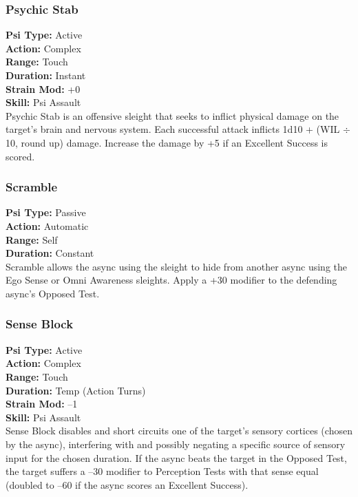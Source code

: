 \subsubsection{Psychic Stab}
\textbf{Psi Type:} Active \\ 
\textbf{Action:} Complex \\ 
\textbf{Range:} Touch \\ 
\textbf{Duration:} Instant \\
\textbf{Strain Mod:} +0 \\ 
\textbf{Skill:} Psi Assault \\
Psychic Stab is an offensive sleight that seeks to inflict
physical damage on the target’s brain and nervous
system. Each successful attack inflicts 1d10 + (WIL $\div$
10, round up) damage. Increase the damage by +5 if
an Excellent Success is scored.

\subsubsection{Scramble}
\textbf{Psi Type:} Passive \\ 
\textbf{Action:} Automatic \\ 
\textbf{Range:} Self \\ 
\textbf{Duration:} Constant \\
Scramble allows the async using the sleight to hide
from another async using the Ego Sense or Omni
Awareness sleights. Apply a +30 modifier to the defending
async’s Opposed Test.

\subsubsection{Sense Block}
\textbf{Psi Type:} Active \\ 
\textbf{Action:} Complex \\ 
\textbf{Range:} Touch \\ 
\textbf{Duration:} Temp (Action Turns) \\
\textbf{Strain Mod:} –1 \\ 
\textbf{Skill:} Psi Assault \\
Sense Block disables and short circuits one of the target’s
sensory cortices (chosen by the async), interfering
with and possibly negating a specific source of sensory
input for the chosen duration. If the async beats the
target in the Opposed Test, the target suffers a –30
modifier to Perception Tests with that sense equal (doubled
to –60 if the async scores an Excellent Success).


